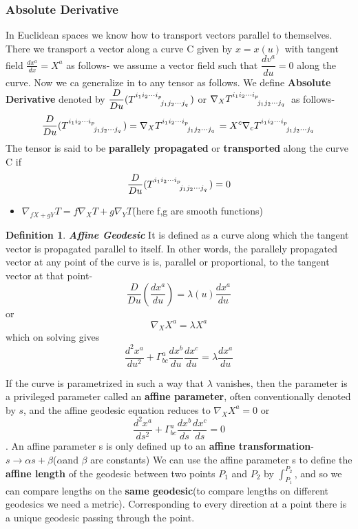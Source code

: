 \documentclass[12pt,a4paper]{article}
\numberwithin{table}{section}
\numberwithin{figure}{section}
\numberwithin{equation}{section}
\theoremstyle{remark}
\theoremstyle{definition}
\newtheorem{definition}{Definition}[section]
\begin{document}
\subsubsection{Absolute Derivative}
In Euclidean spaces we know how to transport vectors parallel to themselves. There we transport a vector along a curve C given by $x=x(u)$ with tangent field $\frac{dx^a}{dx}=X^a$ as follows- we assume a vector field such that $\dfrac{dv^a}{du}=0$ along the curve. Now we ca generalize in to any tensor as follows. We define \textbf{Absolute Derivative} denoted by $\dfrac{D}{Du}(\tensor{T}{^{i_1i_2\cdots i_p}_{j_1j_2\cdots j_q}})$ or $\nabla_X \tensor{T}{^{i_1i_2\cdots i_p}_{j_1j_2\cdots j_q}}$ as follows-
$$\dfrac{D}{Du}(\tensor{T}{^{i_1i_2\cdots i_p}_{j_1j_2\cdots j_q}})=\nabla_X \tensor{T}{^{i_1i_2\cdots i_p}_{j_1j_2\cdots j_q}}=X^c\nabla_c \tensor{T}{^{i_1i_2\cdots i_p}_{j_1j_2\cdots j_q}}$$
The tensor is said to be \textbf{parallely propagated} or \textbf{transported} along the curve C if 
$$\dfrac{D}{Du}(\tensor{T}{^{i_1i_2\cdots i_p}_{j_1j_2\cdots j_q}})=0$$

\begin{itemize}
    \item $\nabla_{fX+gY}T=f\nabla_XT+g\nabla_YT$(here f,g are smooth functions)
\end{itemize}
\begin{definition}{\textbf{\textit{Affine Geodesic}}}
It is defined as a curve along which the tangent vector is propagated parallel to itself. In other words, the parallely propagated vector at any point of the curve is is, parallel or proportional, to the tangent vector at that point-
$$\dfrac{D}{Du}(\dfrac{dx^a}{du})=\lambda(u)\dfrac{dx^a}{du}$$
or
$$\nabla_X X^a=\lambda X^a $$
which on solving gives
$$\dfrac{d^2x^a}{du^2}+\Gamma^a_{bc}\dfrac{dx^b}{du}\dfrac{dx^c}{du}=\lambda\dfrac{dx^a}{du} $$

\end{definition}
If the curve is parametrized in such a way that $\lambda$ vanishes, then the  
parameter is a privileged parameter called an \textbf{affine parameter}, often  
conventionally denoted by $s$, and the affine geodesic equation reduces to $\nabla_X X^a=0$ or 
$$\dfrac{d^2x^a}{ds^2}+\Gamma^a_{bc}\dfrac{dx^b}{ds}\dfrac{dx^c}{ds}=0 $$.
An affine parameter s is only defined up to an \textbf{affine transformation}-$s\rightarrow\alpha s+\beta$($\alpha$and $\beta$ are constants)
We can use the affine parameter s to define the \textbf{affine length} of the geodesic between two points $P_1$ and $P_2$ by $\int_{P_1}^{P_2}$, and so 
we can compare lengths on the \textbf{same geodesic}(to compare lengths on different geodesics we need a metric). Corresponding to every direction at a point there is a unique geodesic passing through the point.
\end{document}
